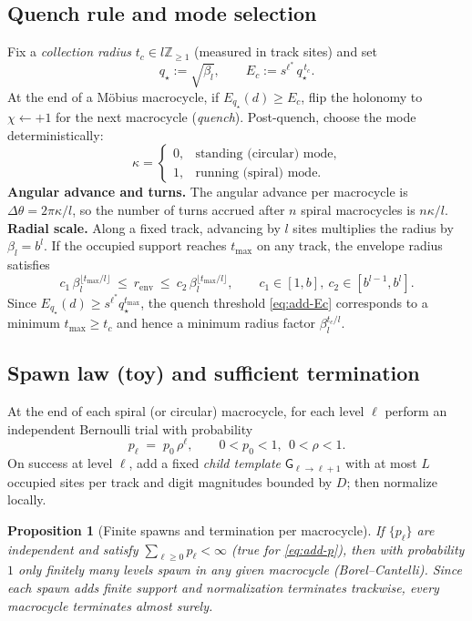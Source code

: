 \documentclass[11pt]{article}
\newtheorem{proposition}[theorem]{Proposition}
\theoremstyle{definition}
\theoremstyle{remark}
\newcommand{\Z}{\mathbb{Z}}
\begin{document}
\subsection*{Quench rule and mode selection}
Fix a \emph{collection radius} $t_c\in l\Z_{\ge 1}$ (measured in track sites) and set
\begin{equation}\label{eq:add-Ec}
  q_\star:=\sqrt{\beta_l},\qquad E_c := s^{\ell^{*}}\,q_\star^{\,t_c}.
\end{equation}
At the end of a M\"obius macrocycle, if $E_{q_\star}(d)\ge E_c$, flip the holonomy to $\chi\leftarrow +1$ for the next macrocycle (\emph{quench}).
Post-quench, choose the mode deterministically:
\begin{equation}\label{eq:add-kappa}
  \kappa=\begin{cases}
    0, & \text{standing (circular) mode},\\
    1, & \text{running (spiral) mode}.
  \end{cases}
\end{equation}
\textbf{Angular advance and turns.} The angular advance per macrocycle is $\Delta\theta=2\pi\kappa/l$, so the number of turns accrued after $n$ spiral macrocycles is $n\kappa/l$.\\
\textbf{Radial scale.} Along a fixed track, advancing by $l$ sites multiplies the radius by $\beta_l=b^l$. If the occupied support reaches $t_{\max}$ on any track, the envelope radius satisfies
\begin{equation}
  c_1\,\beta_l^{\lfloor t_{\max}/l\rfloor}\ \le\ r_{\mathrm{env}}\ \le\ c_2\,\beta_l^{\lfloor t_{\max}/l\rfloor},
  \qquad c_1\in[1,b],\ c_2\in[b^{l-1},b^l].
\end{equation}
Since $E_{q_\star}(d)\ge s^{\ell^{*}}q_\star^{t_{\max}}$, the quench threshold \eqref{eq:add-Ec} corresponds to a minimum $t_{\max}\ge t_c$ and hence a minimum radius factor $\beta_l^{t_c/l}$.

\subsection*{Spawn law (toy) and sufficient termination}
At the end of each spiral (or circular) macrocycle, for each level $\ell$ perform an independent Bernoulli trial with probability
\begin{equation}\label{eq:add-p}
  p_\ell \;=\; p_0\,\rho^\ell,\qquad 0<p_0<1,\ \ 0<\rho<1.
\end{equation}
On success at level $\ell$, add a fixed \emph{child template} $\mathsf G_{\ell\to \ell+1}$ with at most $L$ occupied sites per track and digit magnitudes bounded by $D$; then normalize locally.
\begin{proposition}[Finite spawns and termination per macrocycle]
If $\{p_\ell\}$ are independent and satisfy $\sum_{\ell\ge0} p_\ell<\infty$ (true for \eqref{eq:add-p}), then with probability $1$ only finitely many levels spawn in any given macrocycle (Borel--Cantelli). Since each spawn adds finite support and normalization terminates trackwise, every macrocycle terminates almost surely.
\end{proposition}
\end{document}
